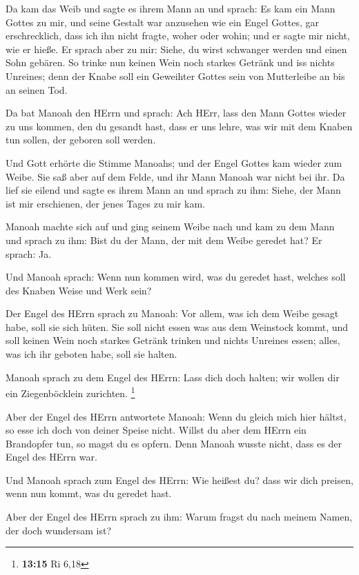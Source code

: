  Da kam das Weib und sagte es ihrem Mann an und sprach: Es
kam ein Mann Gottes zu mir, und seine Gestalt war anzusehen wie ein
Engel Gottes, gar erschrecklich, dass ich ihn nicht fragte, woher oder
wohin; und er sagte mir nicht, wie er hieße.  Er sprach
aber zu mir: Siehe, du wirst schwanger werden und einen Sohn gebären. So
trinke nun keinen Wein noch starkes Getränk und iss nichts Unreines;
denn der Knabe soll ein Geweihter Gottes sein von Mutterleibe an bis an
seinen Tod.

 Da bat Manoah den HErrn und sprach: Ach HErr, lass den
Mann Gottes wieder zu uns kommen, den du gesandt hast, dass er uns
lehre, was wir mit dem Knaben tun sollen, der geboren soll werden.

 Und Gott erhörte die Stimme Manoahs; und der Engel Gottes
kam wieder zum Weibe. Sie saß aber auf dem Felde, und ihr Mann Manoah
war nicht bei ihr.  Da lief sie eilend und sagte es ihrem
Mann an und sprach zu ihm: Siehe, der Mann ist mir erschienen, der jenes
Tages zu mir kam.

 Manoah machte sich auf und ging seinem Weibe nach und
kam zu dem Mann und sprach zu ihm: Bist du der Mann, der mit dem Weibe
geredet hat? Er sprach: Ja.

 Und Manoah sprach: Wenn nun kommen wird, was du geredet
hast, welches soll des Knaben Weise und Werk sein?

 Der Engel des HErrn sprach zu Manoah: Vor allem, was ich
dem Weibe gesagt habe, soll sie sich hüten.  Sie soll
nicht essen was aus dem Weinstock kommt, und soll keinen Wein noch
starkes Getränk trinken und nichts Unreines essen; alles, was ich ihr
geboten habe, soll sie halten.

 Manoah sprach zu dem Engel des HErrn: Lass dich doch
halten; wir wollen dir ein Ziegenböcklein zurichten. \footnote{\textbf{13:15}
  Ri 6,18}

 Aber der Engel des HErrn antwortete Manoah: Wenn du
gleich mich hier hältst, so esse ich doch von deiner Speise nicht.
Willst du aber dem HErrn ein Brandopfer tun, so magst du es opfern. Denn
Manoah wusste nicht, dass es der Engel des HErrn war.

 Und Manoah sprach zum Engel des HErrn: Wie heißest du?
dass wir dich preisen, wenn nun kommt, was du geredet hast.

 Aber der Engel des HErrn sprach zu ihm: Warum fragst du
nach meinem Namen, der doch wundersam ist?

